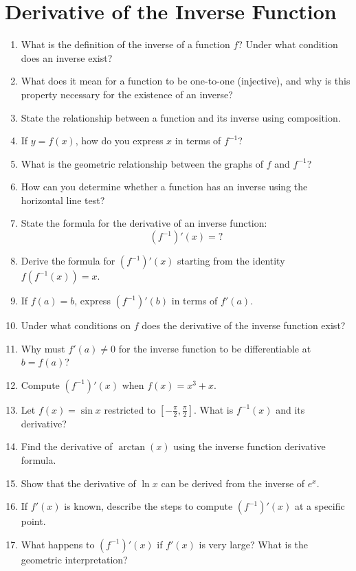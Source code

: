 \section{Derivative of the Inverse Function}

\begin{enumerate}
  \item What is the definition of the inverse of a function \(f\)? Under what condition does an inverse exist?
  \item What does it mean for a function to be one-to-one (injective), and why is this property necessary for the existence of an inverse?
  \item State the relationship between a function and its inverse using composition.
  \item If \(y = f(x)\), how do you express \(x\) in terms of \(f^{-1}\)?
  \item What is the geometric relationship between the graphs of \(f\) and \(f^{-1}\)?
  \item How can you determine whether a function has an inverse using the horizontal line test?
  \item State the formula for the derivative of an inverse function:
    \[ (f^{-1})'(x) = ? \]
  \item Derive the formula for \(\left(f^{-1}\right)'(x)\) starting from the identity \(f(f^{-1}(x)) = x\).
  \item If \(f(a) = b\), express \(\left(f^{-1}\right)'(b)\) in terms of \(f'(a)\).
  \item Under what conditions on \(f\) does the derivative of the inverse function exist?
  \item Why must \(f'(a) \neq 0\) for the inverse function to be differentiable at \(b = f(a)\)?
  \item Compute \(\left(f^{-1}\right)'(x)\) when \(f(x) = x^{3} + x\).
  \item Let \(f(x) = \sin x\) restricted to \(\left[-\frac{\pi}{2}, \frac{\pi}{2}\right]\). What is \(f^{-1}(x)\) and its derivative?
  \item Find the derivative of \(\arctan(x)\) using the inverse function derivative formula.
  \item Show that the derivative of \(\ln x\) can be derived from the inverse of \(e^{x}\).
  \item If \(f'(x)\) is known, describe the steps to compute \(\left(f^{-1}\right)'(x)\) at a specific point.
  \item What happens to \(\left(f^{-1}\right)'(x)\) if \(f'(x)\) is very large? What is the geometric interpretation?

\end{enumerate}
